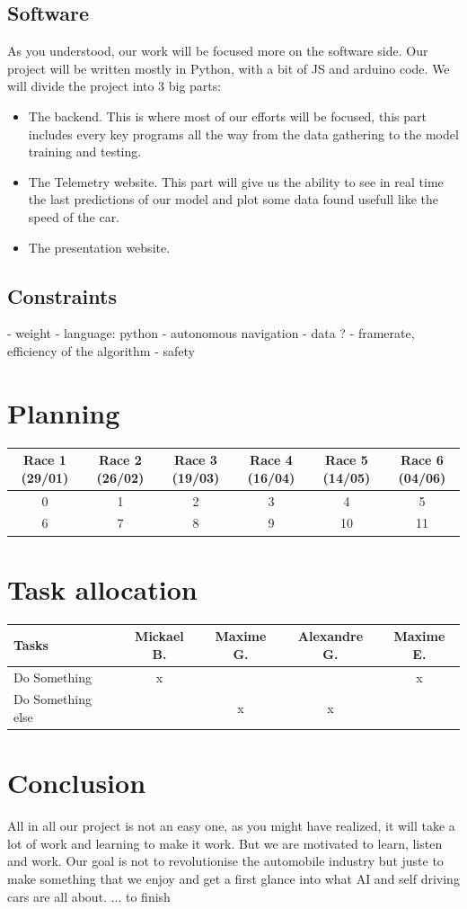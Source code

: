 \documentclass[12pt]{article}
\begin{document}
\subsection{Software}
As you understood, our work will be focused more on the software side.
Our project will be written mostly in Python, with a bit of JS and arduino code.
We will divide the project into 3 big parts:
\begin{itemize}
\item The backend. This is where most of our efforts will be focused, this part includes every key programs all the way from the data gathering to the model training and testing.
\item The Telemetry website. This part will give us the ability to see in real time the last predictions of our model and plot some data found usefull like the speed of the car.
\item The presentation website. 
\end{itemize}

 

\subsection{Constraints}
- weight
- language: python
- autonomous navigation
- data ?
- framerate, efficiency of the algorithm
- safety

\section {Planning}
{
\begin{tabular}{|c|c|c|c|c|c|}
  \hline
  Race 1 \tiny{(29/01)} & Race 2 \tiny{(26/02)} & Race 3 \tiny{(19/03)} &  Race 4 \tiny{(16/04)} &  Race 5 \tiny{(14/05)} &  Race 6 \tiny{(04/06)} \\
  \hline
  0 & 1 & 2 & 3 & 4 & 5 \\
  \hline
  6 & 7 & 8 & 9 & 10 & 11 \\
  \hline
\end{tabular}
}

\section {Task allocation}
\begin{tabular}{|l|c|c|c|c|}
  \hline  Tasks & Mickael B. & Maxime G. & Alexandre G. &  Maxime E.\\
  \hline  Do Something & x &  &  & x \\
  \hline  Do Something else &  & x & x & \\
  \hline
\end{tabular}

\section {Conclusion}
All in all our project is not an easy one, as you might have realized, it will take a lot of work and learning to make it work. But we are motivated to learn, listen and work. Our goal is not to revolutionise the automobile industry but juste to make something that we enjoy and get a first glance into what AI and self driving cars are all about. 
... to finish
\end{document}
